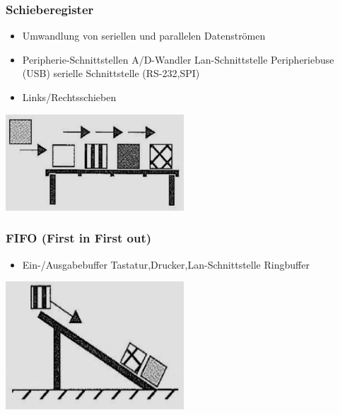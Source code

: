 \subsubsection{Schieberegister}
\begin{itemize}
    \item Umwandlung von seriellen und parallelen Datenströmen
    \item Peripherie-Schnittstellen
    \subitem A/D-Wandler
    \subitem Lan-Schnittstelle
    \subitem Peripheriebuse (USB)
    \subitem serielle Schnittstelle (RS-232,SPI)
    \item Links/Rechtsschieben
\end{itemize}
\begin{minipage}{0.5\linewidth}
    \includegraphics[width=0.5\textwidth]{images/SystembusSpeicherSpeichersystem/SpeicherSysSchiebReg}
\end{minipage}\newline

\subsubsection{FIFO (First in First out)}
\begin{itemize}
    \item Ein-/Ausgabebuffer
    \subitem Tastatur,Drucker,Lan-Schnittstelle
    \subitem Ringbuffer
\end{itemize}
\begin{minipage}{0.5\linewidth}
    \includegraphics[width=0.5\textwidth]{images/SystembusSpeicherSpeichersystem/SpeicherSysFIFO}
\end{minipage}\newline

